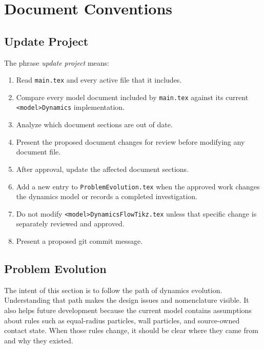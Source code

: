 \section{Document Conventions}

\subsection{Update Project}

The phrase \emph{update project} means:
\begin{enumerate}
\item Read \texttt{main.tex} and every active file that it includes.
\item Compare every model document included by \texttt{main.tex} against its
current \texttt{<model>Dynamics} implementation.
\item Analyze which document sections are out of date.
\item Present the proposed document changes for review before modifying any
document file.
\item After approval, update the affected document sections.
\item Add a new entry to \texttt{ProblemEvolution.tex} when the approved work
changes the dynamics model or records a completed investigation.
\item Do not modify \texttt{<model>DynamicsFlowTikz.tex} unless that specific
change is separately reviewed and approved.
\item Present a proposed git commit message.
\end{enumerate}

\subsection{Problem Evolution}
\label{sec:problem-evolution}

The intent of this section is to follow the path of dynamics evolution.
Understanding that path makes the design issues and nomenclature visible.  It
also helps future development because the current model contains assumptions
about rules such as equal-radius particles, wall particles, and source-owned
contact state.  When those rules change, it should be clear where they came
from and why they existed.

